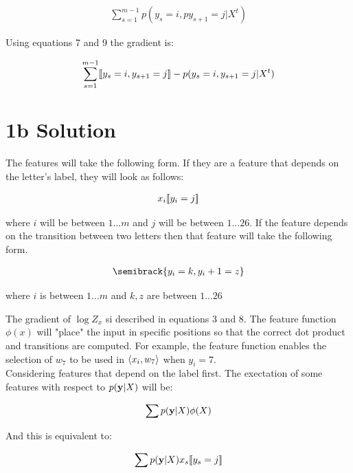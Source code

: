 \documentclass[11pt]{report}
\begin{document}
	\begin{align}
	 \sum_{s=1}^{m-1} {p(y_s=i, py_{s+1}=j | X^t)}
	\end{align}


	Using equations 7 and 9 the gradient is:

	\begin{align}
	\sum_{s=1}^{m-1} [\![y_s = i, y_{s+1} = j]\!] - p(y_s=i, y_{s+1}=j | X^t)
	\end{align}
	

\section*{1b Solution}

The features will take the following form. If they are a feature that depends on the letter's label, they will look as follows:


	\begin{align}
	x_i [\![y_i=j]\!]
	\end{align}

where $i$ will be between $1...m$ and $j$ will be between $1...26$. If the feature depends on the transition between two letters then that feature will take the following form. 


	\begin{align}
	\semibrack{y_i = k, y_i+1 = z}
	\end{align}

where $i$ is between $1...m$ and $k, z$ are between $1...26$

The gradient of $\log Z_x$ si described in equations 3 and 8. The feature function $\phi(x)$ will "place" the input in specific positions so that the correct dot product and transitions are computed. For example, the feature function enables the selection of $w_7$ to be used in $\left\langle x_i,w_7 \right\rangle$ when $y_i = 7$. \\

Considering features that depend on the label first. The exectation of some features with respect to $p(\mathbf{\boldsymbol{y}}|X)$ will be:

	\begin{align}
	\sum p(\mathbf{\boldsymbol{y}}|X)\phi(X)
	\end{align}

And this is equivalent to:

	\begin{align}
	\sum p(\mathbf{\boldsymbol{y}}|X)x_s [\![y_s=j]\!]
	\end{align}
\end{document}
